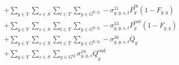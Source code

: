 \documentclass{article}
\newcommand{\sStorage}{G^{\mathrm{Q}}}
\newcommand{\sStorageExisting}{G^{\mathrm{E,Q}}}
\newcommand{\sStorageCandidate}{G^{\mathrm{C,Q}}}
\newcommand{\sYears}{Y}
\newcommand{\sScenarios}{S}
\newcommand{\sIntervals}{T}
\newcommand{\iGenerator}{g}
\newcommand{\iYear}{y}
\newcommand{\iScenario}{s}
\newcommand{\iInterval}{t}
\newcommand{\cPowerChargingMax}[1][\iGenerator]{\overline{P}^{\mathrm{in}}_{#1}}
\newcommand{\cPowerDischargingMax}[1][\iGenerator]{\overline{P}^{\mathrm{out}}_{#1}}
\newcommand{\cStorageUnitEnergyMax}[1][\iGenerator]{\overline{Q}_{#1}}
\newcommand{\cStorageUnitEnergyIntervalEndMin}[1][\iGenerator]{\underline{Q}^{\mathrm{end}}_{#1}}
\newcommand{\cRetirementIndicator}[1][\iGenerator,\iYear]{F_{#1}}
\newcommand{\vPowerIn}[1][\iGenerator,\iYear,\iScenario,\iInterval]{p^{\mathrm{in}}_{#1}}
\newcommand{\vPowerOut}[1][\iGenerator,\iYear,\iScenario,\iInterval]{p^{\mathrm{out}}_{#1}}
\newcommand{\vStorageUnitEnergy}[1][\iGenerator,\iYear,\iScenario,\iInterval]{q_{#1}}
\newcommand{\vInstalledCapacityTotal}[1][\iGenerator,\iYear]{a_{#1}}
\newcommand{\dNonNegativeCharging}[1][\iGenerator,\iYear,\iScenario,\iInterval]{\sigma_{#1}^{9}}
\newcommand{\dNonNegativeDischarging}[1][\iGenerator,\iYear,\iScenario,\iInterval]{\sigma_{#1}^{10}}
\newcommand{\dMaxChargingRateExisting}[1][\iGenerator,\iYear,\iScenario,\iInterval]{\sigma_{#1}^{11}}
\newcommand{\dMaxChargingRateCandidate}[1][\iGenerator,\iYear,\iScenario,\iInterval]{\sigma_{#1}^{12}}
\newcommand{\dMaxDischargingRateExisting}[1][\iGenerator,\iYear,\iScenario,\iInterval]{\sigma_{#1}^{13}}
\newcommand{\dMaxDischargingRateCandidate}[1][\iGenerator,\iYear,\iScenario,\iInterval]{\sigma_{#1}^{14}}
\newcommand{\dNonNegativeStorageEnergy}[1][\iGenerator,\iYear,\iScenario,\iInterval]{\sigma_{#1}^{15}}
\newcommand{\dMaxStorageEnergyExisting}[1][\iGenerator,\iYear,\iScenario,\iInterval]{\sigma_{#1}^{16}}
\newcommand{\dMaxStorageEnergyCandidate}[1][\iGenerator,\iYear,\iScenario,\iInterval]{\sigma_{#1}^{17}}
\newcommand{\dMinStorageEnergyIntervalEnd}[1][\iGenerator,\iYear,\iScenario]{\sigma_{#1}^{18}}
\begin{document}
\begin{align}
& + \sum\limits_{\iYear \in \sYears}\sum\limits_{\iScenario \in \sScenarios}\sum\limits_{\iInterval \in \sIntervals} \sum\limits_{\iGenerator \in \sStorageExisting} - \dMaxChargingRateExisting \cPowerChargingMax \left(1 - \cRetirementIndicator\right)\\
& + \sum\limits_{\iYear \in \sYears}\sum\limits_{\iScenario \in \sScenarios}\sum\limits_{\iInterval \in \sIntervals} \sum\limits_{\iGenerator \in \sStorageExisting} - \dMaxDischargingRateExisting \cPowerDischargingMax \left(1 - \cRetirementIndicator\right)\\
& + \sum\limits_{\iYear \in \sYears}\sum\limits_{\iScenario \in \sScenarios}\sum\limits_{\iInterval \in \sIntervals} \sum\limits_{\iGenerator \in \sStorageExisting} - \dMaxStorageEnergyExisting \cStorageUnitEnergyMax\\
& + \sum\limits_{\iYear \in \sYears}\sum\limits_{\iScenario \in \sScenarios} \sum\limits_{\iGenerator \in \sStorage} \dMinStorageEnergyIntervalEnd \cStorageUnitEnergyIntervalEndMin\\

\end{align}
\end{document}
